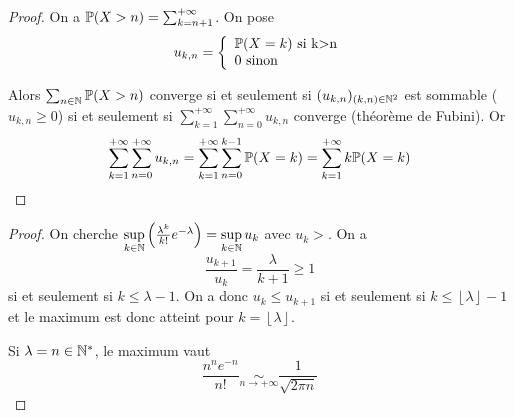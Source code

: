 \documentclass[12pt]{article}
\begin{document}
\begin{proof}
    On a $\P(X>n)=\sum_{k=n+1}^{+\infty}$. On pose 
    \begin{equation}
        u_{k,n}=
        \left\lbrace
            \begin{array}[]{l}
                \P(X=k)\text{ si k>n}\\
                0 \text{ sinon}
            \end{array}
        \right.
    \end{equation}

    Alors $\sum_{n\in\N}\P(X>n)$ converge si et seulement si $(u_{k,n})_{(k,n)\in\N^{2}}$ est sommable ($u_{k,n}\geqslant0$) si et seulement si $\sum_{k=1}^{+\infty}\sum_{n=0}^{+\infty}u_{k,n}$ converge (théorème de Fubini). Or 
    \begin{equation}
        \sum_{k=1}^{+\infty}\sum_{n=0}^{+\infty}u_{k,n}=\sum_{k=1}^{+\infty}\sum_{n=0}^{k-1}\P(X=k)=\sum_{k=1}^{+\infty}k\P(X=k)
    \end{equation}
\end{proof}

\begin{proof}
    On cherche $\sup\limits_{k\in\N}\left(\frac{\lambda^{k}}{k!}e^{-\lambda}\right)=\sup\limits_{k\in\N}u_{k}$ avec $u_{k}>$. On a 
    \begin{equation}
        \frac{u_{k+1}}{u_{k}}=\frac{\lambda}{k+1}\geqslant 1 
    \end{equation}
    si et seulement si $k\leqslant\lambda-1$. On a donc $u_{k}\leqslant u_{k+1}$ si et seulement si $k\leqslant \left\lfloor\lambda\right\rfloor-1$ et le maximum est donc atteint pour $k=\left\lfloor\lambda\right\rfloor$.

    Si $\lambda=n\in\N^{*}$, le maximum vaut 
    \begin{equation}
        \frac{n^{n}e^{-n}}{n!}\underset{n\to+\infty}{\sim}\frac{1}{\sqrt{2\pi n}}
    \end{equation}
\end{proof}
\end{document}
